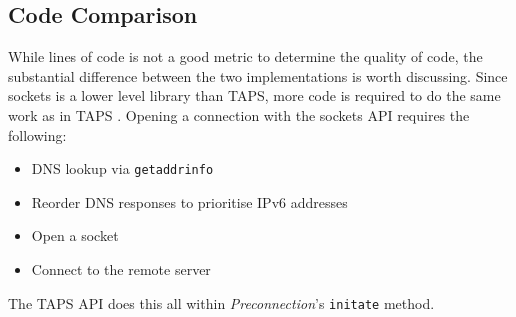 \subsection{Code Comparison}\label{subsec:lines-of-code-comparison}
While lines of code is not a good metric to determine the quality of code, the substantial difference between the two
implementations is worth discussing.
Since sockets is a lower level library than TAPS, more code is required to do the same work as in TAPS .
Opening a connection with the sockets API requires the following:
\begin{itemize}
    \item DNS lookup via \texttt{getaddrinfo}
    \item Reorder DNS responses to prioritise IPv6 addresses
    \item Open a socket
    \item Connect to the remote server
\end{itemize}
The TAPS API does this all within \emph{Preconnection}'s \texttt{initate} method.


